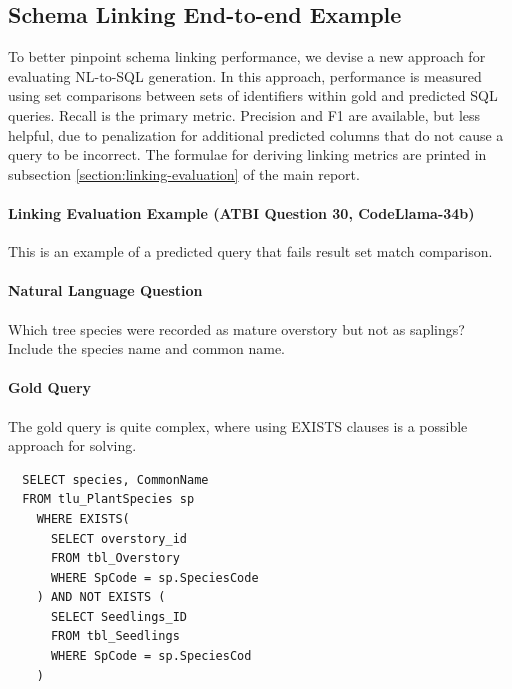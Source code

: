 \subsection{Schema Linking End-to-end Example}

To better pinpoint schema linking performance, we devise a new approach for evaluating NL-to-SQL generation.
In this approach, performance is measured using set comparisons between sets of identifiers within gold and predicted SQL queries.
Recall is the primary metric.
Precision and F1 are available, but less helpful, due to penalization for additional predicted columns that do not cause a query to be incorrect.
The formulae for deriving linking metrics are printed in subsection \ref{section:linking-evaluation} of the main report.

\paragraph{\textbf{Linking Evaluation Example (ATBI Question 30, CodeLlama-34b)}}
This is an example of a predicted query that fails result set match comparison.

\paragraph{Natural Language Question}
Which tree species were recorded as mature overstory but not as saplings? Include the species name and common name.

\paragraph{Gold Query}
The gold query is quite complex, where using EXISTS clauses is a possible approach for solving.
\begin{verbatim}
  SELECT species, CommonName 
  FROM tlu_PlantSpecies sp 
    WHERE EXISTS(
      SELECT overstory_id  	
      FROM tbl_Overstory  	
      WHERE SpCode = sp.SpeciesCode
    ) AND NOT EXISTS (
      SELECT Seedlings_ID  	
      FROM tbl_Seedlings  	
      WHERE SpCode = sp.SpeciesCod
    )
\end{verbatim}

